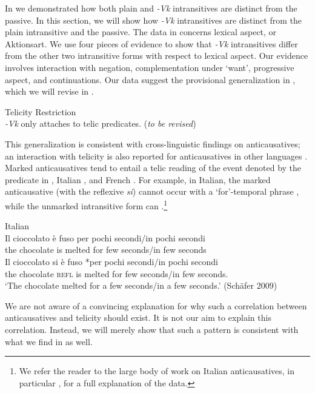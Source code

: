 \documentclass[output=paper]{langsci/lanmgscibook}
\begin{document}
In  we demonstrated how both plain and \textit{-Vk} intransitives are distinct from the passive. In this section, we will show how \textit{-Vk} intransitives are distinct from the plain intransitive and the passive. The data in  concerns lexical aspect, or Aktionsart. We use four pieces of evidence to show that \textit{-Vk} intransitives differ from the other two intransitive forms with respect to lexical aspect. Our evidence involves interaction with negation, complementation under ‘want’, progressive aspect, and continuations. Our data suggest the provisional generalization in , which we will revise in .

\ea\label{ex:gluckman:10} 
{{Telicity Restriction}}\\
 \textit{-Vk} only attaches to telic predicates. (\textit{to be revised})
\z

This generalization is consistent with cross-linguistic findings on anticausatives; an interaction with telicity is also reported for anticausatives in other languages \citep{Labelle1992,Folli2002,FolliHarley2005}. Marked anticausatives tend to entail a telic reading of the event denoted by the predicate in  \citep{AlexiadouAnagnostopoulou2004}, Italian \citep{Folli2002}, and French \citep{ZribiHertz1987}. For example, in Italian, the marked anticausative (with the reflexive \textit{si}) cannot occur with a ‘for’-temporal phrase , while the unmarked intransitive form can .\footnote{We refer the reader to the large body of work on Italian anticausatives, in particular \citet{Folli2002}, for a full explanation of the data.}

\ea\label{ex:gluckman:11}
  {Italian}\\
  \ea\label{ex:gluckman:11a}
  \gll  Il   cioccolato è  fuso     per pochi secondi/in pochi secondi\\
	the chocolate  is melted for few    seconds/in few    seconds\\
  \ex       \label{ex:gluckman:11b}
  \gll   Il    cioccolato si     è  fuso     *per pochi secondi/in pochi secondi\\
	the chocolate  \textsc{refl} is melted  for   few   seconds/in few seconds. \\
  \glt ‘The chocolate melted for a few seconds/in a few seconds.’     (Schäfer 2009)
  \z
\z

We are not aware of a convincing explanation for why such a correlation between anticausatives and telicity should exist. It is not our aim to explain this correlation. Instead, we will merely show that such a pattern is consistent with what we find in  as well. 
\end{document}
